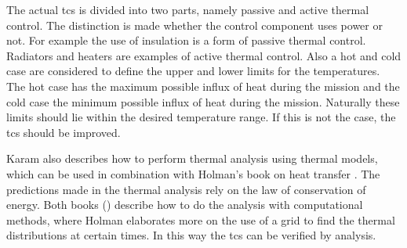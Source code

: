 The actual \gls{tcs} is divided into two parts, namely passive and active thermal control. The distinction is made whether the control component uses power or not. For example the use of insulation is a form of passive thermal control. Radiators and heaters are examples of active thermal control. Also a hot and cold case are considered to define the upper and lower limits for the temperatures. The hot case has the maximum possible influx of heat during the mission and the cold case the minimum possible influx of heat during the mission. Naturally these limits should lie within the desired temperature range. If this is not the case, the \gls{tcs} should be improved.  \cite{Karam1998}

Karam also describes how to perform thermal analysis using thermal models, which can be used in combination with Holman's book on heat transfer \cite{Holman2002}. The predictions made in the thermal analysis rely on the law of conservation of energy. Both books (\cite{Karam1998,Holman2002}) describe how to do the analysis with computational methods, where Holman elaborates more on the use of a grid to find the thermal distributions at certain times. In this way the \gls{tcs} can be verified by analysis.




